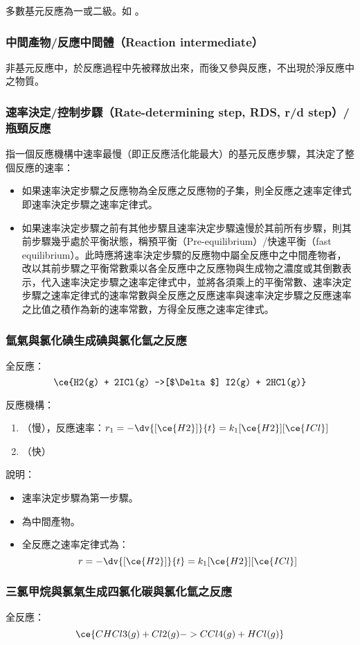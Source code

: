 \documentclass[a4paper,12pt]{article}
\begin{document}
多數基元反應為一或二級。如 。
\subsubsection{中間產物/反應中間體（Reaction intermediate）}
非基元反應中，於反應過程中先被釋放出來，而後又參與反應，不出現於淨反應中之物質。
\subsubsection{速率決定/控制步驟（Rate-determining step, RDS, r/d step）/瓶頸反應}
指一個反應機構中速率最慢（即正反應活化能最大）的基元反應步驟，其決定了整個反應的速率：
\begin{itemize}
\item 如果速率決定步驟之反應物為全反應之反應物的子集，則全反應之速率定律式即速率決定步驟之速率定律式。
\item 如果速率決定步驟之前有其他步驟且速率決定步驟遠慢於其前所有步驟，則其前步驟幾乎處於平衡狀態，稱預平衡（Pre-equilibrium）/快速平衡（fast equilibrium）。此時應將速率決定步驟的反應物中屬全反應中之中間產物者，改以其前步驟之平衡常數乘以各全反應中之反應物與生成物之濃度或其倒數表示，代入速率決定步驟之速率定律式中，並將各須乘上的平衡常數、速率決定步驟之速率定律式的速率常數與全反應之反應速率與速率決定步驟之反應速率之比值之積作為新的速率常數，方得全反應之速率定律式。
\end{itemize}
\subsubsection{氫氣與氯化碘生成碘與氯化氫之反應}
全反應：
\[\ce{H2(g) + 2ICl(g) ->[$\Delta$] I2(g) + 2HCl(g)}\]

反應機構：
\begin{enumerate}
\item {}（慢），反應速率：$r_1=-\dv{[\ce{H2}]}{t}=k_1[\ce{H2}][\ce{ICl}]$
\item {}（快）
\end{enumerate}

說明：
\begin{itemize}
\item 速率決定步驟為第一步驟。
\item {}為中間產物。
\item 全反應之速率定律式為：
\[r=-\dv{[\ce{H2}]}{t}=k_1[\ce{H2}][\ce{ICl}]\]
\end{itemize}
\subsubsection{三氯甲烷與氯氣生成四氯化碳與氯化氫之反應}
全反應：
\[\ce{CHCl3(g) + Cl2(g) -> CCl4(g) + HCl(g)}\]
\end{document}
